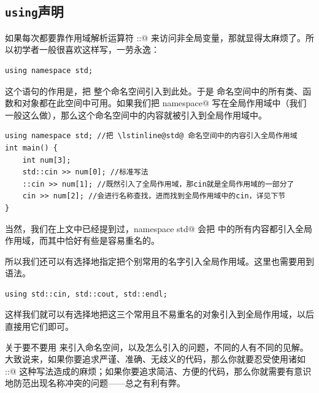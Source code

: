 \subsection*{\texttt{using}声明}
如果每次都要靠作用域解析运算符 \lstinline@::@ 来访问非全局变量，那就显得太麻烦了。所以初学者一般很喜欢这样写，一劳永逸：
\begin{lstlisting}
using namespace std;
\end{lstlisting}
这个语句的作用是，把 \lstinline@std@ 整个命名空间引入到此处。于是 \lstinline@std@ 命名空间中的所有类、函数和对象都在此空间中可用。如果我们把 \lstinline@using namespace@ 写在全局作用域中（我们一般这么做），那么这个命名空间中的内容就被引入到全局作用域中。
\begin{lstlisting}
using namespace std; //把 \lstinline@std@ 命名空间中的内容引入全局作用域
int main() {
    int num[3];
    std::cin >> num[0]; //标准写法
    ::cin >> num[1]; //既然引入了全局作用域，那cin就是全局作用域的一部分了
    cin >> num[2]; //会进行名称查找，进而找到全局作用域中的cin，详见下节
}
\end{lstlisting}
当然，我们在上文中已经提到过，\lstinline@using namespace std@ 会把 \lstinline@std@ 中的所有内容都引入全局作用域，而其中恰好有些是容易重名的。\par
所以我们还可以有选择地指定把个别常用的名字引入全局作用域。这里也需要用到 \lstinline@using@ 语法。
\begin{lstlisting}
using std::cin, std::cout, std::endl;
\end{lstlisting}
这样我们就可以有选择地把这三个常用且不易重名的对象引入到全局作用域，以后直接用它们即可。\par
关于要不要用 \lstinline@using@ 来引入命名空间，以及怎么引入的问题，不同的人有不同的见解。大致说来，如果你要追求严谨、准确、无歧义的代码，那么你就要忍受使用诸如 \lstinline@std::@ 这种写法造成的麻烦；如果你要追求简洁、方便的代码，那么你就需要有意识地防范出现名称冲突的问题——总之有利有弊。\par
